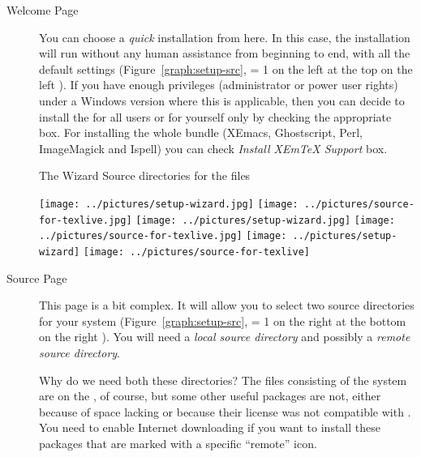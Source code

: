 \documentclass{article}
\begin{document}
\begin{description}
\item[Welcome Page] 
  You can choose a \emph{quick} installation from
  here.  In this case, the installation will run without any human
  assistance from beginning to end, with all the default settings
  (Figure~\ref{graph:setup-src},
  \ifnum \Status = 1
  on the left%
  \else\ifnum {}
  at the top%
  \else
  on the left%
  \fi\fi
  ).   If you have enough privileges (administrator or power user
  rights) under a Windows version where this is applicable, then you can
  decide to install the \TeXLive{} for all users or for yourself only by
  checking the appropriate box.
  For installing the whole \XEmTeX{} bundle (XEmacs, Ghost\-script,
  Perl, ImageMagick and Ispell) you can check \emph{Install XEmTeX 
  Support} box.
  \begin{figure*}[!htb]
  The  Wizard\hfill
  Source directories for the \TeXLive{} files

 \begin{center}
  \ifnum {}
    \texttt{[image: ../pictures/setup-wizard.jpg]}\hfill%
    \texttt{[image: ../pictures/source-for-texlive.jpg]}
  \else
    \ifnum {}
\texttt{[image: ../pictures/setup-wizard.jpg]}
\texttt{[image: ../pictures/source-for-texlive.jpg]}
    \else
        \texttt{[image: ../pictures/setup-wizard]}%
                        \hfill%
        \texttt{[image: ../pictures/source-for-texlive]}
    \fi
  \fi
 \caption{The \TeXLive{} setup wizard}\label{graph:setup-src}
 \end{center}
\end{figure*}
\item[Source Page] 
  This page is a bit complex. It will allow you to select two source
  directories for your \TeXLive{} system
  (Figure~\ref{graph:setup-src}, 
  \ifnum \Status = 1
  on the right%
  \else\ifnum {}
  at the bottom%
  \else
  on the right%
  \fi\fi
  ). You will need a \emph{local
  source directory} and possibly a \emph{remote source directory}.

Why do we need both these directories? The files consisting of the
\TeXLive{} system are on the \CD{}, of course, but some other useful
packages are not, either because of space lacking or because their
license was not compatible with \TeXLive{}.  You need to enable Internet
downloading if you want to install these packages that are marked with a
specific ``remote'' icon.


\end{description}
\end{document}
